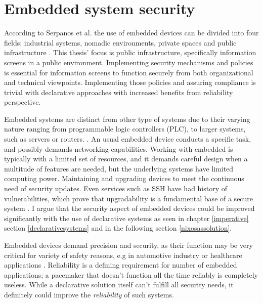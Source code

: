 \chapter{Embedded system security} \label{embedded}

According to Serpanos et al. the use of embedded devices can be
divided into four fields: industrial systems, nomadic environments,
private spaces and public infrastructure
\cite{serpanos2013security}. This thesis' focus is public
infrastructure, specifically information screens in a public
environment. Implementing security mechanisms and policies is
essential for information screens to function securely from both
organizational and technical viewpoints. Implementing those policies
and assuring compliance is trivial with declarative approaches with
increased benefits from reliability perspective.

Embedded systems are distinct from other type of systems due to their
varying nature ranging from programmable logic controllers (PLC), to
larger systems, such as servers or
routers. \cite{fysarakis2014embedded}. An usual embedded device
conducts a specific task, and possibly demands networking
capabilities. Working with embedded is typically with a limited set of
resources, and it demands careful design when a multitude of features
are needed, but the underlying systems have limited computing
power. Maintaining and upgrading devices to meet the continuous need
of security updates. Even services such as SSH have had history of
vulnerabilities, which prove that upgradability is a fundamental base
of a secure system \cite{secopsolutionHistorySecOps}. I argue that the
security aspect of embedded devices could be improved significantly
with the use of declarative systems as seen in chapter
\ref{imperative} section \ref{declarativesystems} and in the following
section \ref{nixosassolution}.

Embedded devices demand precision and security, as their function may
be very critical for variety of safety reasons, e.g in automotive
industry or healthcare applications \cite{turab2019secure,
  fysarakis2014embedded}. Reliability is a defining requirement for
number of embedded applications; a pacemaker that doesn't function all
the time reliably is completely useless. While a declarative solution
itself can't fulfill all security needs, it definitely could improve
the \textit{reliability} of such systems.


